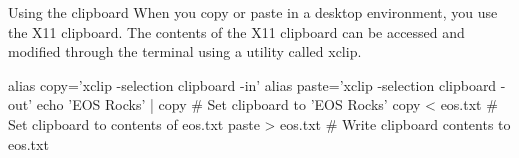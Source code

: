 \begin{block}{Using the clipboard}
  When you copy or paste in a desktop environment, you use the X11 clipboard. The contents of the X11 clipboard can be accessed and modified through the terminal using a utility called xclip.
  \begin{indented}
    \begin{bashcode}
      alias copy='xclip -selection clipboard -in'
      alias paste='xclip -selection clipboard -out'
      echo 'EOS Rocks' | copy # Set clipboard to 'EOS Rocks'
      copy < eos.txt          # Set clipboard to contents of eos.txt
      paste > eos.txt         # Write clipboard contents to eos.txt
    \end{bashcode}
  \end{indented}
\end{block}
